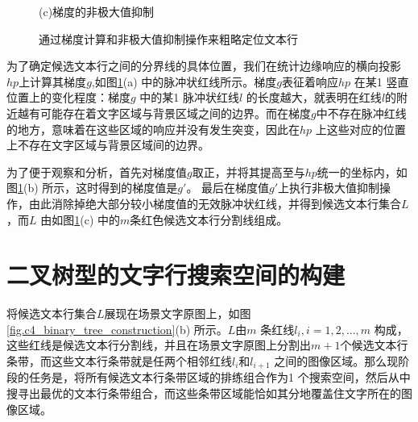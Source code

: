 \begin{figure}[!h]
\begin{minipage}[t]{0.32\linewidth}
        \centerline{\small (c)梯度的非极大值抑制}
        \end{minipage}
        \caption{通过梯度计算和非极大值抑制操作来粗略定位文本行}
        \label{fig.c4_candidate_line_construction}
        \end{figure}

        为了确定候选文本行之间的分界线的具体位置，我们在统计边缘响应的横向投影$hp$上计算其梯度$g$,如图\ref{fig.c4_candidate_line_construction}(a) 中的脉冲状红线所示。梯度$g$表征着响应$hp$ 在某1 竖直位置上的变化程度：梯度$g$ 中的某1 脉冲状红线$l$ 的长度越大，就表明在红线$l$的附近越有可能存在着文字区域与背景区域之间的边界。而在梯度$g$中不存在脉冲红线的地方，意味着在这些区域的响应并没有发生突变，因此在$hp$ 上这些对应的位置上不存在文字区域与背景区域间的边界。

        为了便于观察和分析，首先对梯度值$g$取正，并将其提高至与$hp$统一的坐标内，如图\ref{fig.c4_candidate_line_construction}(b) 所示，这时得到的梯度值是$g$$'$。 最后在梯度值$g$$'$上执行非极大值抑制操作，由此消除掉绝大部分较小梯度值的无效脉冲状红线，并得到候选文本行集合$L$，而$L$ 由如图\ref{fig.c4_candidate_line_construction}(c) 中的$m$条红色候选文本行分割线组成。

    \section{二叉树型的文字行搜索空间的构建}

    将候选文本行集合$L$展现在场景文字原图上，如图\ref{fig.c4_binary_tree_construction}(b) 所示。$L$由$m$ 条红线$l_i, i=1,2,...,m$ 构成，这些红线是候选文本行分割线，并且在场景文字原图上分割出$m+1$个候选文本行条带，而这些文本行条带就是任两个相邻红线$l_i$和$l_{i+1}$ 之间的图像区域。那么现阶段的任务是，将所有候选文本行条带区域的排练组合作为1 个搜索空间，然后从中搜寻出最优的文本行条带组合，而这些条带区域能恰如其分地覆盖住文字所在的图像区域。

